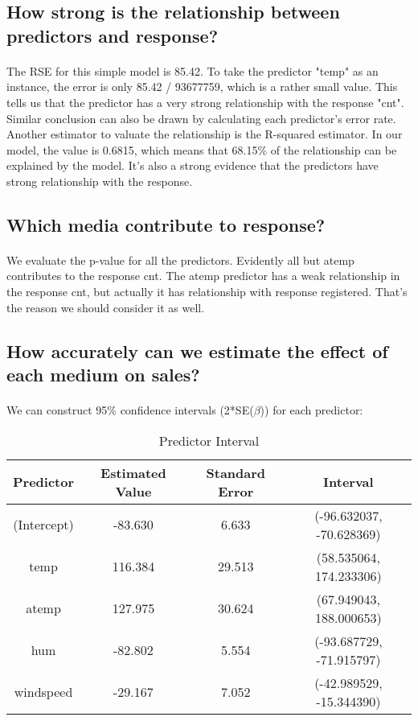\documentclass{article}[]
\begin{document}
\subsection{How strong is the relationship between predictors and response?}
\paragraph{}
The RSE for this simple model is 85.42. To take the predictor "temp" as an instance, the error is only 85.42 / 93677759, which is a rather small value. This tells us that the predictor has a very strong relationship with the response "cnt". Similar conclusion can also be drawn by calculating each predictor's error rate. Another estimator to valuate the relationship is the R-squared estimator. In our model, the value is 0.6815, which means that 68.15\% of the
relationship can be explained by the model. It's also a strong evidence that the predictors have strong relationship with the response.

\subsection{Which media contribute to response?}
\paragraph{}
We evaluate the p-value for all the predictors. Evidently all but atemp contributes to the response cnt. The atemp predictor has a weak relationship in the response cnt, but actually it has relationship with response registered. That's the reason we should consider it as well.

\subsection{How accurately can we estimate the effect of each medium on sales?}
\paragraph{}
We can construct 95\% confidence intervals (2*SE($\beta$)) for each predictor:

\begin{table}
\caption{Predictor Interval}
\centering
\begin{tabular}{c|c|c|c}
\hline
{\bf Predictor}&{\bf Estimated Value}&{\bf Standard Error}&{\bf Interval}\\
\hline
(Intercept)  &-83.630      &6.633 &(-96.632037, -70.628369)\\
temp         &116.384     &29.513 &(58.535064, 174.233306)\\
atemp        &127.975     &30.624 &(67.949043, 188.000653)\\
hum          &-82.802      &5.554 &(-93.687729, -71.915797)\\
windspeed    &-29.167      &7.052 &(-42.989529, -15.344390)\\
\hline
\end{tabular}
\label{table:predictor_interval_table}
\end{table}
\end{document}
